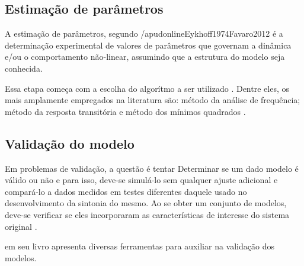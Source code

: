 \subsection{Estimação de parâmetros}
\label{subsec:estimacao_de_parametros}

A estimação de parâmetros, segundo /apudonline{Eykhoff1974}{Favaro2012} é a determinação experimental
de valores de parâmetros que governam a dinâmica e/ou o comportamento não-linear, assumindo que a
estrutura do modelo seja conhecida.

Essa etapa começa com a escolha do algorítmo a ser utilizado \cite{Aguirre2015}. Dentre eles, os
mais amplamente empregados na literatura são: método da análise de frequência; método da resposta
transitória e método dos mínimos quadrados \cite{Favaro2012}.

\subsection{Validação do modelo}
\label{subsec:validacao_do_modelo}

Em problemas de validação, a questão é tentar Determinar se um dado modelo é válido ou não e para isso,
deve-se simulá-lo sem qualquer ajuste adicional e compará-lo a dados medidos em testes diferentes daquele
usado no desenvolvimento da sintonia do mesmo. Ao se obter um conjunto de modelos, deve-se verificar se
eles incorporaram as características de interesse do sistema original \cite{Aguirre2015}.

 em seu livro apresenta diversas ferramentas para auxiliar na validação dos modelos.

